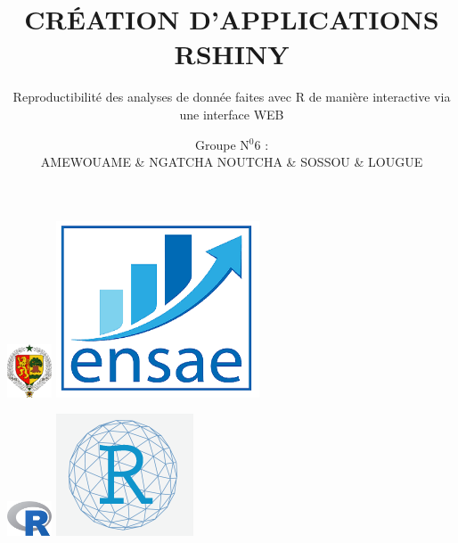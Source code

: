 \documentclass[11pt]{beamer}
\begin{document}
	\author{Groupe N$^{0}6$ :\\ AMEWOUAME \& NGATCHA NOUTCHA \& SOSSOU \& LOUGUE }
	\title{CR\'EATION D'APPLICATIONS RSHINY}
	\subtitle{Reproductibilité des analyses de donnée faites avec R de manière interactive via une interface WEB }
	\begin{frame}[plain]
		\includegraphics[width=0.1\textwidth]{armoirie_sen.png}%
		\hspace{8.2cm}
		\includegraphics[width=0.1\linewidth]{logo-ensae.png}%
		\maketitle
		\includegraphics[width=0.1\textwidth]{R_logo.svg.png}%
		\hspace{8.2cm}
		\includegraphics[width=0.1\linewidth]{Logo R_shiny}%
	\end{frame}
	
	
\end{document}
